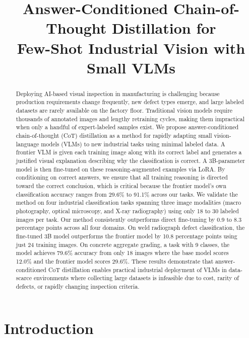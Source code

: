 \documentclass{bmvc2k}
\title{Answer-Conditioned Chain-of-Thought Distillation for\\Few-Shot Industrial Vision with Small VLMs}
\begin{document}
\maketitle

\begin{abstract}
Deploying AI-based visual inspection in manufacturing is challenging because production requirements change frequently, new defect types emerge, and large labeled datasets are rarely available on the factory floor. Traditional vision models require thousands of annotated images and lengthy retraining cycles, making them impractical when only a handful of expert-labeled samples exist. We propose answer-conditioned chain-of-thought (CoT) distillation as a method for rapidly adapting small vision-language models (VLMs) to new industrial tasks using minimal labeled data. A frontier VLM is given each training image along with its correct label and generates a justified visual explanation describing why the classification is correct. A 3B-parameter model is then fine-tuned on these reasoning-augmented examples via LoRA. By conditioning on correct answers, we ensure that all training reasoning is directed toward the correct conclusion, which is critical because the frontier model's own classification accuracy ranges from 29.6\% to 91.1\% across our tasks. We validate the method on four industrial classification tasks spanning three image modalities (macro photography, optical microscopy, and X-ray radiography) using only 18 to 30 labeled images per task. Our method consistently outperforms direct fine-tuning by 0.9 to 8.3 percentage points across all four domains. On weld radiograph defect classification, the fine-tuned 3B model outperforms the frontier model by 10.8 percentage points using just 24 training images. On concrete aggregate grading, a task with 9 classes, the model achieves 79.6\% accuracy from only 18 images where the base model scores 12.0\% and the frontier model scores 29.6\%. These results demonstrate that answer-conditioned CoT distillation enables practical industrial deployment of VLMs in data-scarce environments where collecting large datasets is infeasible due to cost, rarity of defects, or rapidly changing inspection criteria.
\end{abstract}

\section{Introduction}
\label{sec:intro}
\end{document}
